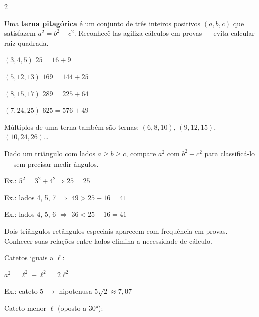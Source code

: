\documentclass[12pt]{article}
\begin{document}
\begin{multicols}{2}

Uma \textbf{terna pitagórica} é um conjunto de três inteiros positivos $(a, b, c)$ que satisfazem $a^2 = b^2 + c^2$. Reconhecê-las agiliza cálculos em provas — evita calcular raiz quadrada.

$(3, 4, 5)$ \quad $25 = 16 + 9$

$(5, 12, 13)$ \quad $169 = 144 + 25$

$(8, 15, 17)$ \quad $289 = 225 + 64$

$(7, 24, 25)$ \quad $625 = 576 + 49$

Múltiplos de uma terna também são ternas: $(6,8,10)$, $(9,12,15)$, $(10,24,26)$\ldots


Dado um triângulo com lados $a \geq b \geq c$, compare $a^2$ com $b^2 + c^2$ para classificá-lo — sem precisar medir ângulos.



Ex.: $5^2 = 3^2 + 4^2 \Rightarrow 25 = 25$ \checkmark



Ex.: lados 4, 5, 7 $\Rightarrow$ $49 > 25 + 16 = 41$ \checkmark



Ex.: lados 4, 5, 6 $\Rightarrow$ $36 < 25 + 16 = 41$ \checkmark


Dois triângulos retângulos especiais aparecem com frequência em provas. Conhecer suas relações entre lados elimina a necessidade de cálculo.


Catetos iguais a $\ell$:

$a^2 = \ell^2 + \ell^2 = 2\ell^2$


Ex.: cateto 5 $\rightarrow$ hipotenusa $5\sqrt{2} \approx 7{,}07$


Cateto menor $\ell$ (oposto a 30°):


\end{multicols}
\end{document}
